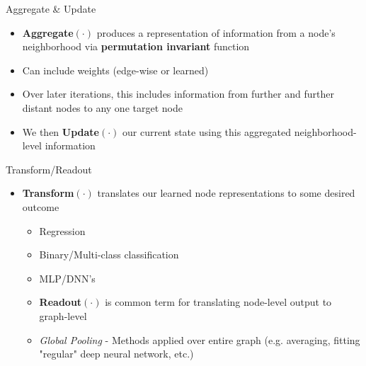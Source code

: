 \documentclass{beamer}
\begin{document}
\begin{frame}{Aggregate \& Update}
    \begin{itemize}
        \item {\bf Aggregate$(\cdot)$} produces a representation of information from a node's neighborhood via {\bf permutation invariant} function
        \item Can include weights (edge-wise or learned)
        \item Over later iterations, this includes information from further and further distant nodes to any one target node 
        \item We then {\bf Update$(\cdot)$} our current state using this aggregated neighborhood-level information
    \end{itemize}
\end{frame}


\begin{frame}{Transform/Readout}
    \begin{itemize}
        \item {\bf Transform$(\cdot)$ } translates our learned node representations to some desired outcome 
        \begin{itemize}
            \item Regression
            \item Binary/Multi-class classification 
            \item MLP/DNN's 
        \item {\bf Readout$(\cdot)$} is common term for translating node-level output to graph-level
            \item {\it Global Pooling} - Methods applied over entire graph (e.g. averaging, fitting "regular" deep neural network, etc.)
        \end{itemize}
    \end{itemize}
\end{frame}
\end{document}
